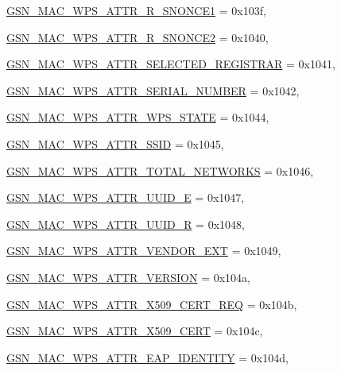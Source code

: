 \begin{DoxyCompactItemize}
\par
\hyperlink{a00642_gga0ae19d69a0b381d883890df8a7812414aee2db55e6fede6b24410a216871d016e}{GSN\_\-MAC\_\-WPS\_\-ATTR\_\-R\_\-SNONCE1} =  0x103f, 
\par
\hyperlink{a00642_gga0ae19d69a0b381d883890df8a7812414a88c81608cdb2a5e022755eb117651766}{GSN\_\-MAC\_\-WPS\_\-ATTR\_\-R\_\-SNONCE2} =  0x1040, 
\par
\hyperlink{a00642_gga0ae19d69a0b381d883890df8a7812414a2523c1744d85b547d72ab907fc72f370}{GSN\_\-MAC\_\-WPS\_\-ATTR\_\-SELECTED\_\-REGISTRAR} =  0x1041, 
\par
\hyperlink{a00642_gga0ae19d69a0b381d883890df8a7812414a6d10efeab9c2b6e2ba656f8a23c3448f}{GSN\_\-MAC\_\-WPS\_\-ATTR\_\-SERIAL\_\-NUMBER} =  0x1042, 
\par
\hyperlink{a00642_gga0ae19d69a0b381d883890df8a7812414a4c38d42c808c6312f62526fd678028b2}{GSN\_\-MAC\_\-WPS\_\-ATTR\_\-WPS\_\-STATE} =  0x1044, 
\par
\hyperlink{a00642_gga0ae19d69a0b381d883890df8a7812414aa230c88c2e2ba08e4f955b304e552bf0}{GSN\_\-MAC\_\-WPS\_\-ATTR\_\-SSID} =  0x1045, 
\par
\hyperlink{a00642_gga0ae19d69a0b381d883890df8a7812414a277667b176aacf858631fd0ea6847ed3}{GSN\_\-MAC\_\-WPS\_\-ATTR\_\-TOTAL\_\-NETWORKS} =  0x1046, 
\par
\hyperlink{a00642_gga0ae19d69a0b381d883890df8a7812414ac5f48c116f9cb5dd46fd2a4e9c3e76d6}{GSN\_\-MAC\_\-WPS\_\-ATTR\_\-UUID\_\-E} =  0x1047, 
\par
\hyperlink{a00642_gga0ae19d69a0b381d883890df8a7812414aa6b19c984ca4e9f72133042f9102dcf8}{GSN\_\-MAC\_\-WPS\_\-ATTR\_\-UUID\_\-R} =  0x1048, 
\par
\hyperlink{a00642_gga0ae19d69a0b381d883890df8a7812414ad30e228111674bab9eabffe99ddf1af3}{GSN\_\-MAC\_\-WPS\_\-ATTR\_\-VENDOR\_\-EXT} =  0x1049, 
\par
\hyperlink{a00642_gga0ae19d69a0b381d883890df8a7812414ace95785bf34b55e3c792f556cd74d4c9}{GSN\_\-MAC\_\-WPS\_\-ATTR\_\-VERSION} =  0x104a, 
\par
\hyperlink{a00642_gga0ae19d69a0b381d883890df8a7812414aa3fdf34a8468ff5000c0e9ef3bacca27}{GSN\_\-MAC\_\-WPS\_\-ATTR\_\-X509\_\-CERT\_\-REQ} =  0x104b, 
\par
\hyperlink{a00642_gga0ae19d69a0b381d883890df8a7812414a6de100ee39618b50cfeea63451215faa}{GSN\_\-MAC\_\-WPS\_\-ATTR\_\-X509\_\-CERT} =  0x104c, 
\par
\hyperlink{a00642_gga0ae19d69a0b381d883890df8a7812414ac26c41281a3d8a08bf5aa9cafd12e1e0}{GSN\_\-MAC\_\-WPS\_\-ATTR\_\-EAP\_\-IDENTITY} =  0x104d, 

\end{DoxyCompactItemize}
